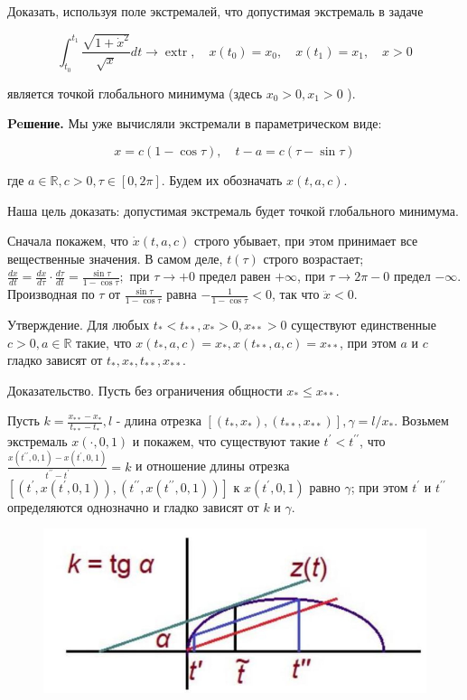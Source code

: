 \begin{task}
Доказать, используя поле экстремалей, что допустимая экстремаль в задаче

$$
\int_{t_{0}}^{t_{1}} \frac{\sqrt{1+\dot{x}^{2}}}{\sqrt{x}} d t \rightarrow \operatorname{extr}, \quad x\left(t_{0}\right)=x_{0}, \quad x\left(t_{1}\right)=x_{1}, \quad x>0
$$

является точкой глобального минимума (здесь $x_{0}>0, x_{1}>0$ ).

\textbf{Peшение.} Мы уже вычисляли экстремали в параметрическом виде:

$$
x=c(1-\cos \tau), \quad t-a=c(\tau-\sin \tau)
$$

где $a \in \mathbb{R}, c>0, \tau \in[0,2 \pi]$. Будем их обозначать $x(t, a, c)$.

Наша цель доказать: допустимая экстремаль будет точкой глобального минимума.

Сначала покажем, что $\dot{x}(t, a, c)$ строго убывает, при этом принимает все вещественные значения. В самом деле, $t(\tau)$ строго возрастает; $\frac{d x}{d t}=\frac{d x}{d \tau} \cdot \frac{d \tau}{d t}=\frac{\sin \tau}{1-\cos \tau} ;$ при $\tau \rightarrow+0$ предел равен $+\infty$, при $\tau \rightarrow 2 \pi-0$ предел $-\infty$. Производная по $\tau$ от $\frac{\sin \tau}{1-\cos \tau}$ равна $-\frac{1}{1-\cos \tau}<0$, так что $\ddot{x}<0$.

Утверждение. Для любых $t_{*}<t_{* *}, x_{*}>0, x_{* *}>0$ существуют единственные $c>0, a \in \mathbb{R}$ такие, что $x\left(t_{*}, a, c\right)=x_{*}, x\left(t_{* *}, a, c\right)=x_{* *}$, при этом $a$ и $c$ гладко зависят от $t_{*}, x_{*}, t_{* *}, x_{* *}$.

Доказательство. Пусть без ограничения общности $x_{*} \leq x_{* *}$.

Пусть $k=\frac{x_{* *}-x_{*}}{t_{* *}-t_{*}}, l$ - длина отрезка $\left[\left(t_{*}, x_{*}\right),\left(t_{* *}, x_{* *}\right)\right], \gamma=l / x_{*}$. Возьмем экстремаль $x(\cdot, 0,1)$ и покажем, что существуют такие $t^{\prime}<t^{\prime \prime}$, что $\frac{x\left(t^{\prime \prime}, 0,1\right)-x\left(t^{\prime}, 0,1\right)}{t^{\prime \prime}-t^{\prime}}=k$ и отношение длины отрезка $\left[\left(t^{\prime}, x\left(t^{\prime}, 0,1\right)\right),\left(t^{\prime \prime}, x\left(t^{\prime \prime}, 0,1\right)\right)\right]$ к $x\left(t^{\prime}, 0,1\right)$ равно $\gamma$; при этом $t^{\prime}$ и $t^{\prime \prime}$ определяются однозначно и гладко зависят от $k$ и $\gamma$.

\begin{figure}[h!]
    \centering
    \includegraphics[width=0.99\linewidth]{tasks/task27/pic1.jpg}
\end{figure}


\end{task}
